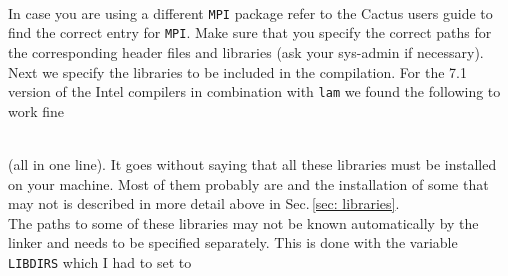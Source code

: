 \documentclass[11pt]{article}
\numberwithin{equation}{section}
\begin{document}


\\

In case you are using a different {\tt MPI} package refer to the Cactus
users guide to find the correct entry for {\tt MPI}. Make sure that you
specify the correct paths for the corresponding header files
and libraries (ask your sys-admin if necessary).\\
Next we specify the libraries to be included in the compilation. For the
7.1 version of the Intel compilers in combination with {\tt lam}
we found the following to work fine\\


\hspace{4.2cm}{\tt POSF90 cprts cxa guide imf intrins irc ircmt ompstub svml}

\hspace{4.2cm}{\tt unwind X11 ieeeio df m mpi lam pmpi}\\

(all in one line). It goes without saying that all these libraries must
be installed on your machine. Most of them probably are and the
installation of some that may not is described in more detail above
in Sec.\,\ref{sec: libraries}. \\
The paths to some of these libraries may not be known automatically by the
linker and needs to be specified separately. This is done with the variable
{\tt LIBDIRS} which I had to set to\\


\hspace{4.2cm}{\tt /usr/X11R6/lib /usr/local/IEEEIO/lib /usr/local/hdf4/lib}

\hspace{4.2cm}{\tt /usr/lib/gcc-lib/i386-redhat-linux/egcs-2.91.66}\\
\end{document}
